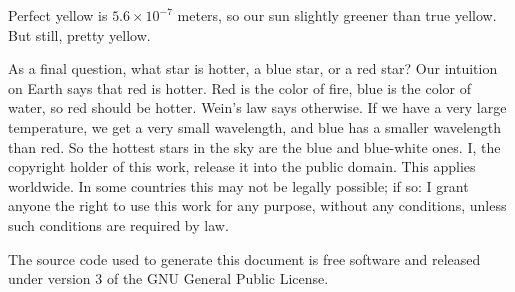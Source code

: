 \documentclass{article}
\begin{document}
    Perfect yellow is $5.6\times{10}^{-7}$ meters, so our sun slightly greener
    than true yellow. But still, pretty yellow.
    \par\hfill\par
    As a final question, what star is hotter, a blue star, or a red star?
    Our intuition on Earth says that red is hotter. Red is the color of fire,
    blue is the color of water, so red should be hotter. Wein's law says
    otherwise. If we have a very large temperature, we get a very small
    wavelength, and blue has a smaller wavelength than red. So the hottest
    stars in the sky are the blue and blue-white ones.
    \newpage
    I, the copyright holder of this work, release it into the public domain.
    This applies worldwide. In some countries this may not be legally possible;
    if so: I grant anyone the right to use this work for any purpose, without
    any conditions, unless such conditions are required by law.
    \par\hfill\par
    The source code used to generate this document is free software and released
    under version 3 of the GNU General Public License.
\end{document}
